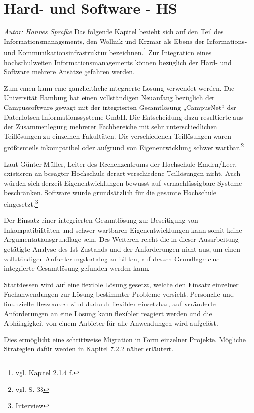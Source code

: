 \section{Hard- und Software - HS}
\textit{Autor: Hannes Sprafke}
Das folgende Kapitel bezieht sich auf den Teil des Informationsmanagements, den Wollnik und Krzmar als Ebene der Informations- und Kommunikationsinfrastruktur bezeichnen.\footnote{vgl. Kapitel 2.1.4 f.} Zur Integration eines hochschulweiten Informationsmanagements können bezüglich der Hard- und Software mehrere Ansätze gefahren werden.

Zum einen kann eine ganzheitliche integrierte Lösung verwendet werden. Die Universität Hamburg hat einen vollständigen Neuanfang bezüglich der Campussoftware gewagt mit der integrierten Gesamtlösung „CampusNet“ der Datenlotsen Informationssysteme GmbH. Die Entscheidung dazu resultierte aus der Zusammenlegung mehrerer Fachbereiche mit sehr unterschiedlichen Teillösungen zu einzelnen Fakultäten. Die verschiedenen Teillösungen waren größtenteils inkompatibel oder aufgrund von Eigenentwicklung schwer wartbar.\footnote {vgl. \cite{dini_webportale_2007} S. 38}

Laut Günter Müller, Leiter des Rechenzentrums der Hochschule Emden/Leer, existieren an besagter Hochschule derart verschiedene Teillösungen nicht. Auch würden sich derzeit Eigenentwicklungen bewusst auf vernachlässigbare Systeme beschränken. Software würde grundsätzlich für die gesamte Hochschule eingesetzt.\footnote{Interview}

Der Einsatz einer integrierten Gesamtlösung zur Beseitigung von Inkompatibilitäten und schwer wartbaren Eigenentwicklungen kann somit keine Argumentationsgrundlage sein.
Des Weiteren reicht die in dieser Ausarbeitung getätigte Analyse des Ist-Zustands und der Anforderungen nicht aus, um einen vollständigen Anforderungskatalog zu bilden, auf dessen Grundlage eine integrierte Gesamtlösung gefunden werden kann.

Stattdessen wird auf eine flexible Lösung gesetzt, welche den Einsatz einzelner Fachanwendungen zur Lösung bestimmter Probleme vorsieht. Personelle und finanzielle Ressourcen sind dadurch flexibler einsetzbar, auf veränderte Anforderungen an eine Lösung kann flexibler reagiert werden und die Abhängigkeit von einem Anbieter für alle Anwendungen wird aufgelöst.

Dies ermöglicht eine schrittweise Migration in Form einzelner Projekte. Mögliche Strategien dafür werden in Kapitel 7.2.2 näher erläutert. 

